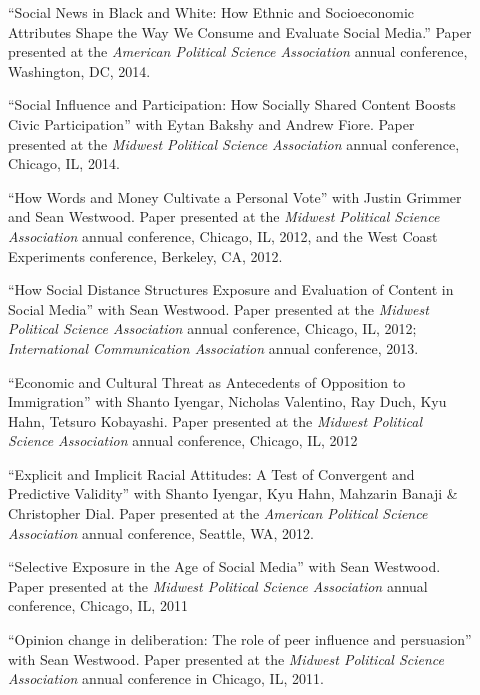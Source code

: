 \documentclass[letterpaper,11pt]{article}
\newcommand{\resheading}[1]{\vspace{4pt}{\large
\colorbox{mygrey}{\begin{minipage}{\textwidth}{\textbf{#1
\vphantom{p\^{E}}}}\end{minipage}}}\vspace{4pt}}
\begin{document}
\resheading{Conference Presentations}
\begin{description}

\item[] ``Social News in Black and White: How Ethnic and Socioeconomic Attributes Shape the Way We Consume and Evaluate Social Media.'' Paper presented at the \emph{American Political Science Association} annual conference, Washington, DC, 2014.

\item[] ``Social Influence and Participation: How Socially Shared Content Boosts Civic Participation'' with Eytan Bakshy and Andrew Fiore.  Paper presented at the \emph{Midwest Political Science Association} annual conference, Chicago, IL, 2014.

\item[] ``How Words and Money Cultivate a Personal Vote'' with Justin Grimmer and Sean Westwood.  Paper presented at the \emph{Midwest Political Science Association} annual conference, Chicago, IL, 2012, and the West Coast Experiments conference, Berkeley, CA, 2012. 

\item[] ``How Social Distance Structures Exposure and Evaluation of Content in Social Media'' with Sean Westwood. Paper presented at the \emph{Midwest Political Science Association} annual conference, Chicago, IL, 2012; \emph{International Communication Association} annual conference, 2013.

\item[] ``Economic and Cultural Threat as Antecedents of Opposition to Immigration'' with Shanto Iyengar, Nicholas Valentino, Ray Duch, Kyu Hahn, Tetsuro Kobayashi.  Paper presented at the \emph{Midwest Political Science Association} annual conference, Chicago, IL, 2012

\item[] ``Explicit and Implicit Racial Attitudes: A Test of Convergent and Predictive Validity'' with Shanto Iyengar, Kyu Hahn, Mahzarin Banaji \& Christopher Dial.  Paper presented at the \emph{American Political Science Association} annual conference, Seattle, WA, 2012. 

\item[] ``Selective Exposure in the Age of Social Media'' with Sean Westwood.  Paper presented at the \emph{Midwest Political Science Association} annual conference, Chicago, IL, 2011

\item[] ``Opinion change in deliberation: The role of peer influence and persuasion'' with Sean Westwood. Paper presented at the \emph{Midwest Political Science Association} annual conference in Chicago, IL, 2011.


\end{description}
\end{document}
